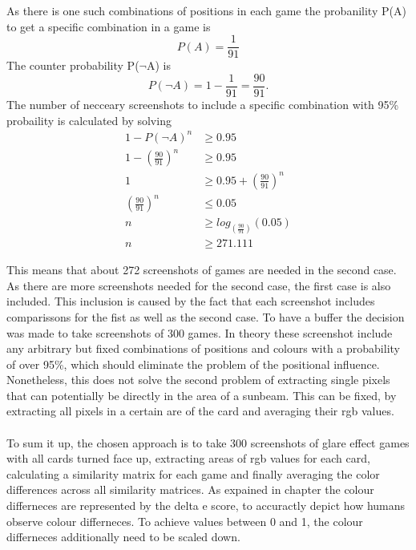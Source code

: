 \begin{center}
	As there is one such combinations of positions in each game the probanility P(A) to get a specific combination in a game is 
	\begin{equation*}
	P(A) = \frac{1}{91} %
	\end{equation*}
	The counter probability P($\lnot$A) is 
	\begin{equation*}
	P(\lnot A) = 1 - \frac{1}{91} = \frac{90}{91}.%
	\end{equation*}
	The number of necceary screenshots to include a specific combination with 95\% probaility is calculated by solving
	\begin{align*}
	1 - P(\lnot A)^n &\geq 0.95 \\
	1 - \left(\frac{90}{91}\right)^n &\geq 0.95 \\
	1 &\geq 0.95 + \left(\frac{90}{91}\right)^n\\
	\left(\frac{90}{91}\right)^n &\leq 0.05\\
	n &\geq log_{(\frac{90}{91})}(0.05) \\
	n &\geq 271.111 %
	\end{align*}
\end{center}
This means that about 272 screenshots of games are needed in the second case. As there are more screenshots needed for the second case, the first case is also included. This inclusion is caused by the fact that each screenshot includes comparissons for the  fist  as well as the second case. To have a buffer the decision was made to take screenshots of 300 games. In theory these screenshot include any arbitrary but fixed combinations of positions and colours with a probability of over 95\%, which should eliminate the problem of the positional influence.\\

Nonetheless, this does not solve the second problem of extracting single pixels that can potentially be directly in the area of a sunbeam. This can be fixed, by extracting all pixels in a certain are of the card and averaging their rgb values. \\\\ %
To sum it up, the chosen approach is to take 300 screenshots of glare effect games with all cards turned face up, extracting areas of rgb values for each card, calculating a similarity matrix for each game and finally averaging the color differences across all similarity matrices. As expained in chapter  the colour differneces are represented by the delta e score, to accuractly depict how humans observe colour differneces. To achieve values between 0 and 1, the colour differneces additionally need to be scaled down.
 

